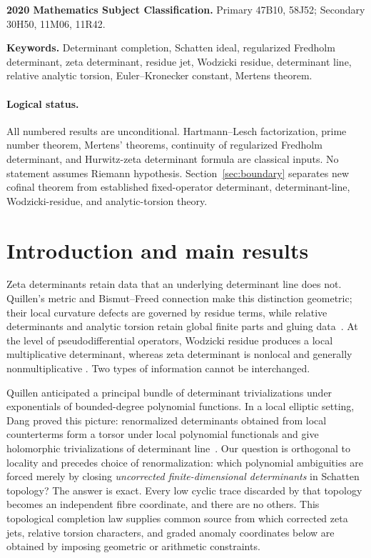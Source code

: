 \documentclass[11pt]{article}
\theoremstyle{definition}
\theoremstyle{remark}
\begin{document}
\noindent\textbf{2020 Mathematics Subject Classification.}
Primary 47B10, 58J52; Secondary 30H50, 11M06, 11R42.

\noindent\textbf{Keywords.}
Determinant completion, Schatten ideal, regularized Fredholm determinant, zeta determinant,
residue jet, Wodzicki residue, determinant line, relative analytic torsion,
Euler--Kronecker constant, Mertens theorem.

\paragraph{Logical status.}
All numbered results are unconditional.  Hartmann--Lesch factorization, prime number theorem,
Mertens' theorems, continuity of regularized Fredholm determinant, and Hurwitz-zeta determinant
formula are classical inputs.  No statement assumes Riemann hypothesis.  Section~\ref{sec:boundary}
separates new cofinal theorem from established fixed-operator determinant, determinant-line,
Wodzicki-residue, and analytic-torsion theory.

\section{Introduction and main results}
\label{sec:intro}

Zeta determinants retain data that an underlying determinant line does not.  Quillen's metric
and Bismut--Freed connection make this distinction geometric; their local curvature defects are
governed by residue terms, while relative determinants and analytic torsion retain global finite
parts and gluing data~\cite{Quillen1985,BismutFreed1986,PaychaRosenberg2000,Scott1999}.
At the level of pseudodifferential operators, Wodzicki residue produces a local multiplicative
determinant, whereas zeta determinant is nonlocal and generally nonmultiplicative
\cite{KontsevichVishik1994,Scott2005}.  Two types of information cannot be interchanged.

Quillen anticipated a principal bundle of determinant trivializations under exponentials of
bounded-degree polynomial functions.  In a local elliptic setting, Dang proved this picture:
renormalized determinants obtained from local counterterms form a torsor under local polynomial
functionals and give holomorphic trivializations of determinant line~\cite{Dang2022}.  Our
question is orthogonal to locality and precedes choice of renormalization: which polynomial
ambiguities are forced merely by closing \emph{uncorrected finite-dimensional determinants} in
Schatten topology?  The answer is exact.  Every low cyclic trace discarded by that topology
becomes an independent fibre coordinate, and there are no others.  This topological completion
law supplies common source from which corrected zeta jets, relative torsion characters, and
graded anomaly coordinates below are obtained by imposing geometric or arithmetic constraints.
\end{document}
